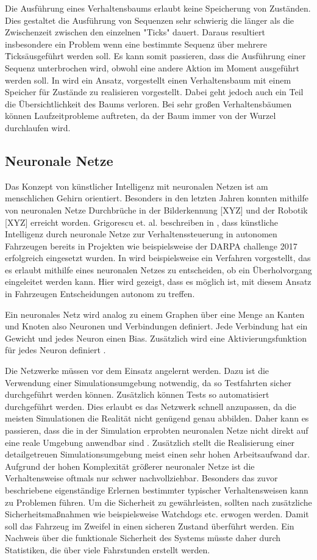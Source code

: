 Die Ausführung eines Verhaltensbaums erlaubt keine Speicherung von Zuständen. Dies gestaltet die Ausführung von Sequenzen sehr schwierig die länger als die Zwischenzeit zwischen den einzelnen "Ticks" dauert. Daraus  resultiert insbesondere ein Problem wenn eine bestimmte Sequenz über mehrere \"Ticks\" ausgeführt werden soll. Es kann somit passieren, dass die Ausführung einer Sequenz unterbrochen wird, obwohl eine andere Aktion im Moment ausgeführt werden soll. In \cite{KLC15} wird ein Ansatz, vorgestellt einen Verhaltensbaum mit einem Speicher für Zustände zu realisieren vorgestellt. Dabei geht jedoch auch ein Teil die Übersichtlichkeit des Baums verloren. Bei sehr großen Verhaltensbäumen können Laufzeitprobleme auftreten, da der Baum immer von der Wurzel durchlaufen wird. 

\subsection{Neuronale Netze}
Das Konzept von künstlicher Intelligenz mit neuronalen Netzen ist am menschlichen Gehirn orientiert. Besonders in den letzten Jahren konnten mithilfe von neuronalen Netze Durchbrüche in der Bilderkennung [XYZ] und der Robotik [XYZ] erreicht worden. Grigorescu et. al. beschreiben in \cite{GRI19}, dass künstliche Intelligenz durch neuronale Netze zur Verhaltenssteuerung in autonomen Fahrzeugen bereits in Projekten wie beispielsweise der DARPA challenge 2017 erfolgreich eingesetzt wurden. In \cite{MIR18} wird beispielsweise ein Verfahren vorgestellt, das es erlaubt mithilfe eines neuronalen Netzes zu entscheiden, ob ein Überholvorgang eingeleitet werden kann. Hier wird gezeigt, dass es möglich ist, mit diesem Ansatz in Fahrzeugen Entscheidungen autonom zu treffen. 

Ein neuronales Netz wird analog zu einem Graphen über eine Menge an Kanten und Knoten also Neuronen und Verbindungen definiert. Jede Verbindung hat ein Gewicht und jedes Neuron einen Bias. Zusätzlich wird eine Aktivierungsfunktion für jedes Neuron definiert \cite{CIT11}.

Die Netzwerke müssen vor dem Einsatz angelernt werden. Dazu ist die Verwendung einer Simulationsumgebung notwendig, da so Testfahrten sicher durchgeführt werden können. Zusätzlich können Tests so automatisiert durchgeführt werden. Dies erlaubt es das Netzwerk schnell anzupassen, da die meisten Simulationen die Realität nicht genügend genau abbilden. Daher kann es passieren, dass die in der Simulation erprobten neuronalen Netze nicht direkt auf eine reale Umgebung anwendbar sind \cite{GRI19}. Zusätzlich stellt die Realisierung einer detailgetreuen Simulationsumgebung meist einen sehr hohen Arbeitsaufwand dar. Aufgrund der hohen Komplexität größerer neuronaler Netze ist die Verhaltensweise oftmals nur schwer nachvollziehbar. Besonders das zuvor beschriebene eigenständige Erlernen bestimmter typischer Verhaltensweisen kann zu Problemen führen. Um die Sicherheit zu gewährleisten, sollten nach \cite{GRI19} zusätzliche Sicherheitsmaßnahmen wie beispielsweise Watchdogs etc. erwogen werden. Damit soll das Fahrzeug im Zweifel in einen sicheren Zustand überführt werden. Ein Nachweis über die funktionale Sicherheit des Systems müsste daher durch Statistiken, die über viele Fahrstunden erstellt werden. 

